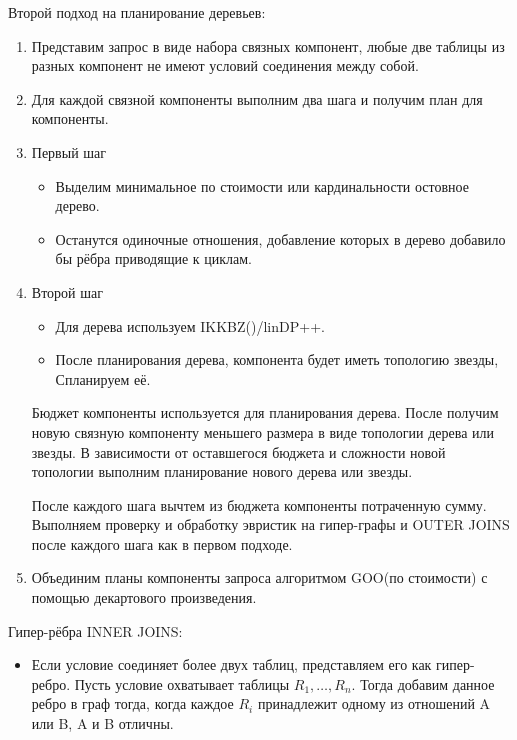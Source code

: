 \documentclass[12pt]{article}
\begin{document}
\begin{flushleft}
\begin{center}
Второй подход на планирование деревьев:
\end{center}

\begin{enumerate}
    \item Представим запрос в виде набора связных компонент, любые две таблицы из разных компонент не имеют условий соединения между собой. 
    \item Для каждой связной компоненты выполним два шага и получим план для компоненты.
    \item Первый шаг
    \begin{itemize}[label={}]
        \item Выделим минимальное по стоимости или кардинальности остовное дерево.
        \item Останутся одиночные отношения, добавление которых в дерево добавило бы рёбра приводящие к циклам.
    \end{itemize}
    \item Второй шаг
    \begin{itemize}[label={}]
        \item Для дерева используем IKKBZ(\cite{IK}\cite{KBZ})/linDP++.
        \item После планирования дерева, компонента будет иметь топологию звезды, Спланируем её. 
    \end{itemize}
    Бюджет компоненты используется для планирования дерева. После получим новую связную компоненту меньшего размера в виде топологии дерева или звезды.
    В зависимости от оставшегося бюджета и сложности новой топологии выполним планирование нового дерева или звезды.
    \newline
    
    После каждого шага вычтем из бюджета компоненты потраченную сумму.
    Выполняем проверку и обработку эвристик на гипер-графы и OUTER JOINS после каждого шага как в первом подходе.
    \item Объединим планы компоненты запроса алгоритмом GOO(по стоимости) с помощью декартового произведения.
\end{enumerate}

Гипер-рёбра INNER JOINS:
\begin{itemize}[label={}]
    \item Если условие соединяет более двух таблиц, представляем его как гипер-ребро. Пусть условие охватывает таблицы $R_1,\dots,R_n$. Тогда добавим данное ребро в граф тогда, когда каждое $R_i$ принадлежит одному из отношений A или B, 
    A и B отличны.
\end{itemize}


\end{flushleft}
\end{document}
